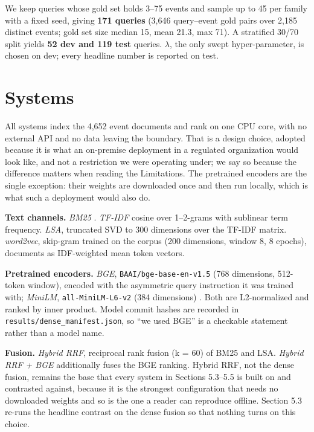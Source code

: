 \documentclass[runningheads]{llncs}
\begin{document}
We keep queries whose gold set holds 3--75 events and sample up to 45 per family with a fixed seed, giving \textbf{171 queries} (3,646 query--event gold pairs over 2,185 distinct events; gold set size median 15, mean 21.3, max 71). A stratified 30/70 split yields \textbf{52 dev and 119 test} queries. $\lambda$, the only swept hyper-parameter, is chosen on dev; every headline number is reported on test.


\section{Systems}
All systems index the 4,652 event documents and rank on one CPU core, with no external API and no data leaving the boundary. That is a design choice, adopted because it is what an on-premise deployment in a regulated organization would look like, and not a restriction we were operating under; we say so because the difference matters when reading the Limitations. The pretrained encoders are the single exception: their weights are downloaded once and then run locally, which is what such a deployment would also do.

\textbf{Text channels.} \textit{BM25} \cite{robertson2009bm25}. \textit{TF-IDF} cosine over 1--2-grams with sublinear term frequency. \textit{LSA}, truncated SVD to 300 dimensions over the TF-IDF matrix. \textit{word2vec}, skip-gram trained on the corpus (200 dimensions, window 8, 8 epochs), documents as IDF-weighted mean token vectors.

\textbf{Pretrained encoders.} \textit{BGE}, \texttt{BAAI/bge-base-en-v1.5} (768 dimensions, 512-token window), encoded with the asymmetric query instruction it was trained with; \textit{MiniLM}, \texttt{all-MiniLM-L6-v2} (384 dimensions) \cite{reimers2019sbert}. Both are L2-normalized and ranked by inner product. Model commit hashes are recorded in \texttt{results/dense\_\allowbreak{}manifest.json}, so ``we used BGE'' is a checkable statement rather than a model name.

\textbf{Fusion.} \textit{Hybrid RRF}, reciprocal rank fusion (k = 60) of BM25 and LSA. \textit{Hybrid RRF + BGE} additionally fuses the BGE ranking. Hybrid RRF, not the dense fusion, remains the base that every system in Sections 5.3--5.5 is built on and contrasted against, because it is the strongest configuration that needs no downloaded weights and so is the one a reader can reproduce offline. Section 5.3 re-runs the headline contrast on the dense fusion so that nothing turns on this choice.
\end{document}
